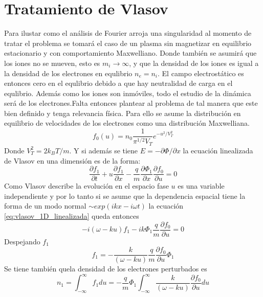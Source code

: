 \documentclass[../tesis_main_file.tex]{subfiles}
\begin{document}
\section{Tratamiento de Vlasov}
Para ilustar como el análisis de Fourier arroja una singularidad al momento de tratar el problema se tomará el caso de un plasma sin magnetizar en equilibrio estacionario y con comportamiento Maxwelliano. Donde también se asumirá que los iones no se mueven, esto es $m_i \to \infty$, y que la densidad de los iones es igual a la densidad de los electrones en equlibrio $n_e =n_i$. El campo electrostático es entonces cero en el equlibrio debido a que hay neutralidad de carga en el equlibrio. Además como los iones son inmóviles, todo el estudio de la dinámica será de los electrones.Falta entonces plantear al problema de tal manera que este bien definido y tenga relevancia física. Para ello se asume la distribución en equilibrio de velocidades de los electrones como una distribución Maxwelliana.
\begin{equation}
\label{eq:fourier_distribucion_maxwelliana}
f_0(u)=n_0\frac{1}{\pi^{1/2}V_T}e^{-u^2/V_T^2}
\end{equation}
Donde $V_T^2=2k_BT/m$. Y si además se tiene $E=- \partial \Phi/\partial x$ la ecuación linealizada de Vlasov en una dimensión es de la forma:
\begin{equation}
\label{eq:vlasov_1D_linealizada}
\frac{\partial f_1}{\partial t}+u\frac{\partial f_1}{\partial x}-\frac{q}{m}\frac{\partial \Phi _1}{\partial x}\frac{\partial f_0}{\partial u}=0
\end{equation}
Como Vlasov describe la evolución en el espacio fase $u$ es una variable independiente y por lo tanto si se asume que la dependencia espacial tiene la forma de un modo normal $\sim exp(ikx-i\omega t)$ la ecuación \ref{eq:vlasov_1D_linealizada} queda entonces
\begin{equation}
-i(\omega-ku)f_1- ik\Phi _1 \frac{q}{m}\frac{\partial f_0}{\partial u}=0
\end{equation}
Despejando $f_1$
\begin{equation}
f_1 =-\frac{k}{(\omega -ku)}\frac{q}{m}\frac{\partial f_0}{\partial u}\Phi_1
\end{equation}
Se tiene también quela densidad de los electrones perturbados es
\begin{equation}
\label{eq:densidad_electrones_perturbados}
n_1 = \int^{\infty}_{-\infty} f_1 du=-\frac{q}{m}\Phi_1 \int^{\infty}_{-\infty}\frac{k}{(\omega-ku)}\frac{\partial f_0}{\partial u}du
\end{equation}
\end{document}
